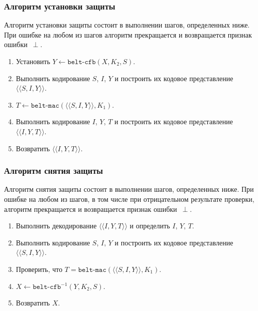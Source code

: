 \subsubsection{Алгоритм установки защиты}
\label{CRYPTO.SM.Algs.Encr}

Алгоритм установки защиты состоит в выполнении шагов, определенных ниже.
При ошибке на любом из шагов алгоритм прекращается и возвращается признак 
ошибки~$\perp$.

\begin{enumerate}
\item
Установить $Y\gets\texttt{belt-cfb}(X, K_2, S)$.

\item
Выполнить кодирование $S$, $I$, $Y$ и построить их кодовое 
представление $\langle\langle S, I, Y\rangle\rangle$.

\item
$T\gets\texttt{belt-mac}(\langle\langle S, I, Y\rangle\rangle, K_1)$.

\item
Выполнить кодирование $I$, $Y$, $T$ и построить их кодовое 
представление $\langle\langle I, Y, T \rangle\rangle$.

\item
Возвратить $\langle\langle I, Y, T \rangle\rangle$.
\end{enumerate}

\subsubsection{Алгоритм снятия защиты}
\label{CRYPTO.SM.Algs.Decr}

Алгоритм снятия защиты состоит в выполнении шагов, определенных ниже. При 
ошибке на любом из шагов, в том числе при отрицательном результате 
проверки, алгоритм прекращается и возвращается признак ошибки~$\perp$.

\begin{enumerate}
\item
Выполнить декодирование $\langle\langle I, Y, T \rangle\rangle$ 
и определить $I$, $Y$, $T$.
 
\item
Выполнить кодирование $S$, $I$, $Y$ и построить их кодовое представление 
$\langle\langle S, I, Y \rangle\rangle$.
 
\item
Проверить, 
что $T=\texttt{belt-mac}(\langle\langle S, I, Y\rangle\rangle, K_1)$.
 
\item
$X\leftarrow\texttt{belt-cfb}^{-1}(Y, K_2, S)$.
 
\item
Возвратить $X$.
\end{enumerate}

